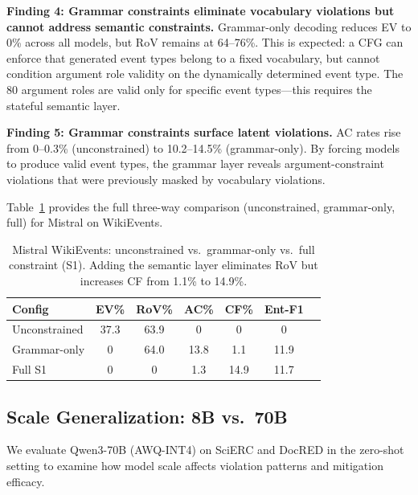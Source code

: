 \documentclass[11pt]{article}
\begin{document}
\textbf{Finding 4: Grammar constraints eliminate vocabulary violations but cannot address semantic constraints.}
Grammar-only decoding reduces EV to 0\% across all models, but RoV remains at 64--76\%.
This is expected: a CFG can enforce that generated event types belong to a fixed vocabulary, but cannot condition argument role validity on the dynamically determined event type.
The 80 argument roles are valid only for specific event types---this requires the stateful semantic layer.

\textbf{Finding 5: Grammar constraints surface latent violations.}
AC rates rise from 0--0.3\% (unconstrained) to 10.2--14.5\% (grammar-only).
By forcing models to produce valid event types, the grammar layer reveals argument-constraint violations that were previously masked by vocabulary violations.

Table~\ref{tab:grammar_mistral_ee} provides the full three-way comparison (unconstrained, grammar-only, full) for Mistral on WikiEvents.

\begin{table}[t]
\centering
\small
\caption{Mistral WikiEvents: unconstrained vs.\ grammar-only vs.\ full constraint (S1). Adding the semantic layer eliminates RoV but increases CF from 1.1\% to 14.9\%.}
\label{tab:grammar_mistral_ee}
\begin{tabular}{lcccccc}
\toprule
\textbf{Config} & \textbf{EV\%} & \textbf{RoV\%} & \textbf{AC\%} & \textbf{CF\%} & \textbf{Ent-F1} \\
\midrule
Unconstrained & 37.3 & 63.9 & 0   & 0    & 0    \\
Grammar-only  & 0    & 64.0 & 13.8 & 1.1  & 11.9 \\
Full S1       & 0    & 0    & 1.3  & 14.9 & 11.7 \\
\bottomrule
\end{tabular}
\end{table}


\subsection{Scale Generalization: 8B vs.\ 70B}
\label{sec:scale}

We evaluate Qwen3-70B (AWQ-INT4) on SciERC and DocRED in the zero-shot setting to examine how model scale affects violation patterns and mitigation efficacy.
\end{document}
